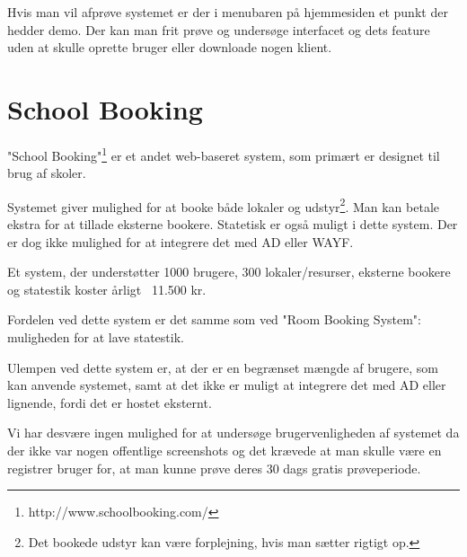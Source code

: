 Hvis man vil afprøve systemet er der i menubaren på hjemmesiden et punkt der hedder demo. Der kan man frit prøve og undersøge interfacet og dets feature uden at skulle oprette bruger eller downloade nogen klient.

\section{School Booking}
\label{Comparison_SB}
"School Booking"\footnote{http://www.schoolbooking.com/} er et andet web-baseret system, som primært er designet til brug af skoler. 

Systemet giver mulighed for at booke både lokaler og udstyr\footnote{Det bookede udstyr kan være forplejning, hvis man sætter rigtigt op.}. Man kan betale ekstra for at tillade eksterne bookere. Statetisk er også muligt i dette system. Der er dog ikke mulighed for at integrere det med AD eller WAYF.

Et system, der understøtter 1000 brugere, 300 lokaler/resurser, eksterne bookere og statestik koster årligt ~11.500 kr.

Fordelen ved dette system er det samme som ved "Room Booking System": muligheden for at lave statestik.

Ulempen ved dette system er, at der er en begrænset mængde af brugere, som kan anvende systemet, samt at det ikke er muligt at integrere det med AD eller lignende, fordi det er hostet eksternt.

Vi har desvære ingen mulighed for at undersøge brugervenligheden af systemet da der ikke var nogen offentlige screenshots og det krævede at man skulle være en registrer bruger for, at man kunne prøve deres 30 dags gratis prøveperiode.